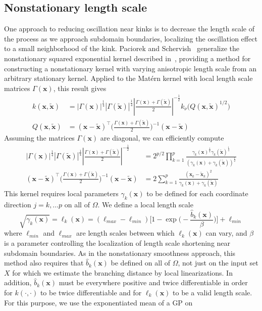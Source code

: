 \documentclass{article}
\newcommand{\abs}[1]{\left|#1\right|}
\renewcommand{\vec}[1]{\mathbf{#1}}
\numberwithin{equation}{section}
\begin{document}
\subsection{Nonstationary length scale}
One approach to reducing oscillation near kinks is to decrease the length scale of the process as we approach subdomain boundaries, localizing the oscillation effect to a small neighborhood of the kink. Paciorek and Schervish~\cite{paciorek2004nonstationary} generalize the nonstationary squared exponential kernel described in~\cite{gibbs1998bayesian}, providing a method for constructing a nonstationary kernel with varying anisotropic length scale from an arbitrary stationary kernel. Applied to the Mat\'ern kernel with local length scale matrices $\Gamma(\vec{x})$, this result gives
\begin{align*}
  k(\vec{x}, \tilde{\vec{x}})
  & = |\Gamma(\vec{x})|^{\frac{1}{4}} |\Gamma(\tilde{\vec{x}})|^{\frac{1}{4}} \abs{\frac{\Gamma(\vec{x}) + \Gamma(\tilde{\vec{x}})}{2}}^{-\frac{1}{2}}
  k_\nu \Big(Q(\vec{x}, \tilde{\vec{x}})^{1/2}\Big) \\
  Q(\vec{x}, \tilde{\vec{x}}) & = (\vec{x} - \tilde{\vec{x}})^\top \Big(\frac{\Gamma(\vec{x}) + \Gamma(\tilde{\vec{x}})}{2}\Big)^{-1} (\vec{x} - \tilde{\vec{x}})
\end{align*}
Assuming the matrices $\Gamma(\vec{x})$ are diagonal, we can efficiently compute
\begin{align*}
   |\Gamma(\vec{x})|^{\frac{1}{4}} |\Gamma(\tilde{\vec{x}})|^{\frac{1}{4}} \abs{\frac{\Gamma(\vec{x}) + \Gamma(\tilde{\vec{x}})}{2}}^{-\frac{1}{2}}
   & = 2^{p/2} \prod_{k=1}^p \frac{\gamma_k(\vec{x})^\frac{1}{4} \gamma_k(\tilde{\vec{x}})^\frac{1}{4}}{(\gamma_k(\vec{x}) + \gamma_k(\tilde{\vec{x}}))^\frac{1}{2}} \\
   (\vec{x} - \tilde{\vec{x}})^\top \Big(\frac{\Gamma(\vec{x}) + \Gamma(\tilde{\vec{x}})}{2}\Big)^{-1} (\vec{x} - \tilde{\vec{x}})
   & = 2 \sum_{k=1}^p \frac{(\vec{x}_k - \tilde{\vec{x}}_k)^2}{\gamma_k(\vec{x}) + \gamma_k(\tilde{\vec{x}})}
\end{align*}
This kernel requires local parameters
$\gamma_k(\vec{x})$ to be defined for each coordinate direction $j=k,...p$ on all of $\Omega$. We define a local length scale
\begin{equation}
  \sqrt{\gamma_k(\vec{x})} = \ell_k(\vec{x}) = (\ell_{max} - \ell_{min}) \bigg[1 - \exp\bigg(-\frac{\hat{b}_k(\vec{x})}{\beta}\bigg)\bigg] + \ell_{min} \label{eq:length}
\end{equation}
where $\ell_{min}$ and $\ell_{max}$ are length scales between which $\ell_k(\vec{x})$ can vary, and $\beta$ is a parameter controlling the localization of length scale shortening near subdomain boundaries. As in the nonstationary smoothness approach, this method also requires that $\hat{b}_k(\vec{x})$ be defined on all of $\Omega$, not just on the input set $X$ for which we estimate the branching distance by local linearizations. In addition, $\hat{b}_k(\vec{x})$ must be everywhere positive and twice differentiable in order for $k(\cdot, \cdot)$ to be twice differentiable and for $\ell_k(\vec{x})$ to be a valid length scale. For this purpose, we use the exponentiated mean of a GP on
\end{document}
